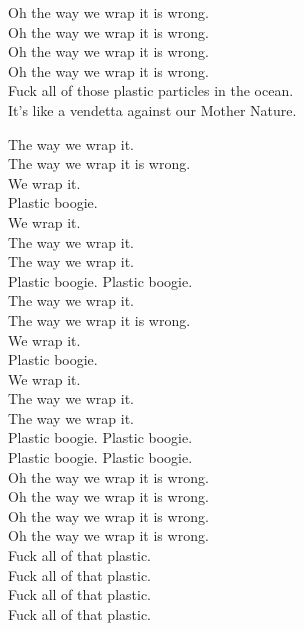 Oh the way we wrap it is wrong. \\
Oh the way we wrap it is wrong. \\
Oh the way we wrap it is wrong. \\
Oh the way we wrap it is wrong. \\

Fuck all of those plastic particles in the ocean. \\
It's like a vendetta against our Mother Nature.

The way we wrap it. \\
The way we wrap it is wrong. \\
We wrap it. \\
Plastic boogie. \\
We wrap it. \\
The way we wrap it. \\
The way we wrap it. \\

Plastic boogie. Plastic boogie. \\

The way we wrap it. \\
The way we wrap it is wrong. \\
We wrap it. \\
Plastic boogie. \\
We wrap it. \\The way we wrap it. \\
The way we wrap it. \\

Plastic boogie. Plastic boogie. \\
Plastic boogie. Plastic boogie. \\

Oh the way we wrap it is wrong. \\
Oh the way we wrap it is wrong. \\
Oh the way we wrap it is wrong. \\
Oh the way we wrap it is wrong. \\

Fuck all of that plastic. \\
Fuck all of that plastic. \\
Fuck all of that plastic. \\
Fuck all of that plastic. \\



